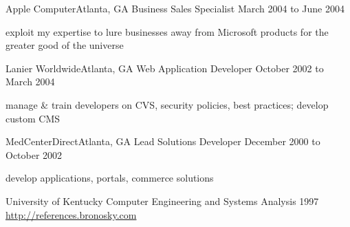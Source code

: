 \documentclass[10pt]{article}
\begin{document}
\sectionheader
{Apple Computer}{Atlanta, GA}
{Business Sales Specialist}
{March 2004 to June 2004}
\begin{longtext}
exploit my expertise to lure businesses away from Microsoft products for the greater good of the universe
\end{longtext}

\sectionheader
{Lanier Worldwide}{Atlanta, GA}
{Web Application Developer}
{October 2002 to March 2004}
\begin{longtext}
manage \& train developers on CVS, security policies, best practices;
develop custom CMS
\end{longtext}

\sectionheader
{MedCenterDirect}{Atlanta, GA}
{Lead Solutions Developer}
{December 2000 to October 2002}
\begin{longtext}
develop applications, portals, commerce solutions
\end{longtext}


\sectionheader
{University of Kentucky}{}
{Computer Engineering and Systems Analysis}
{1997}
\fix
\halfskip
\href{http://references.bronosky.com}{http://references.bronosky.com}
\end{document}
